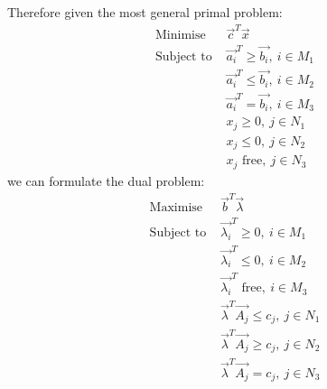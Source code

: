 \documentclass[../Main.tex]{subfiles}
\begin{document}
Therefore given the most general primal problem:
\begin{align*}
    \text{Minimise } &\vec{c}^T\vec{x} \\
    \text{Subject to } &\vec{a_i}^T \geq \vec{b_i},~i \in M_1 \\
    &\vec{a_i}^T \leq \vec{b_i},~i \in M_2 \\
    &\vec{a_i}^T = \vec{b_i},~i \in M_3 \\
    &x_j \geq 0,~j \in N_1 \\
    &x_j \leq 0,~j \in N_2 \\
    &x_j \text{ free},~j \in N_3
\end{align*}
we can formulate the dual problem:
\begin{align*}
    \text{Maximise } &\vec{b}^T\vec{\lambda} \\
    \text{Subject to } &\vec{\lambda_i}^T \geq 0,~i \in M_1 \\
    &\vec{\lambda_i}^T \leq 0,~i \in M_2 \\
    &\vec{\lambda_i}^T \text{ free},~i \in M_3 \\
    &\vec{\lambda}^T \vec{A_j} \leq c_j,~j \in N_1 \\
    &\vec{\lambda}^T \vec{A_j} \geq c_j,~j \in N_2 \\
    &\vec{\lambda}^T \vec{A_j} = c_j,~j \in N_3
\end{align*}
\end{document}
